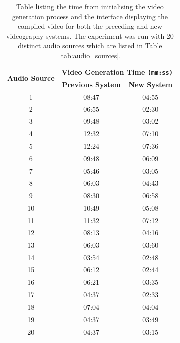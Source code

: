 \documentclass{l4proj}
\begin{document}
\begin{appendices}
\begin{table}
    \centering
    \begin{tabular}{|c|c|c|}
        \hline
        \multirow{2}{*}{\textbf{Audio Source}} & 
        \multicolumn{2}{|c|}{\textbf{Video Generation Time \lstinline|(mm:ss)|}} \\
        \cline{2-3} & \textbf{Previous System} & \textbf{New System} \\ 
        \hline
        \hline
        1 & 08:47 & 04:55 \\
        \hline
        2 & 06:55 & 02:30 \\
        \hline
        3 & 09:48 & 03:02 \\
        \hline
        4 & 12:32 & 07:10 \\
        \hline
        5 & 12:24 & 07:36 \\
        \hline
        6 & 09:48 & 06:09 \\
        \hline
        7 & 05:46 & 03:05 \\
        \hline
        8 & 06:03 & 04:43 \\
        \hline
        9 & 08:30 & 06:58 \\
        \hline
        10 & 10:49 & 05:08 \\
        \hline
        11 & 11:32 & 07:12 \\
        \hline
        12 & 08:13 & 04:16 \\
        \hline
        13 & 06:03 & 03:60 \\
        \hline
        14 & 03:54 & 02:48 \\
        \hline
        15 & 06:12 & 02:44 \\
        \hline
        16 & 06:21 & 03:35 \\
        \hline
        17 & 04:37 & 02:33 \\
        \hline
        18 & 07:04 & 04:04 \\
        \hline
        19 & 04:37 & 03:49 \\
        \hline
        20 & 04:37 & 03:15 \\
        \hline
    \end{tabular}
    \caption{Table listing the time from initialising the video generation process and the interface displaying the compiled video for both the preceding and new videography systems. The experiment was run with 20 distinct audio sources which are listed in Table \ref{tab:audio_sources}.}\label{tab:videography_times}
\end{table}



\end{appendices}
\end{document}
